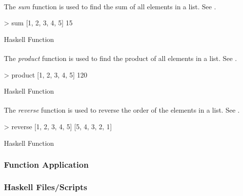 \paragraph{\texorpdfstring{}{\texttt{sum}}}\label{par:List_Sum_Function}
The \emph{sum} function is used to find the sum of all elements in a list.
See .
\begin{listing}[h!tbp]
\begin{haskellsource}
  > sum [1, 2, 3, 4, 5]
  15
\end{haskellsource}
\caption{Haskell  Function}
\label{lst:List_Sum_Function}
\end{listing}

\paragraph{\texorpdfstring{}{\texttt{product}}}\label{par:List_Product_Function}
The \emph{product} function is used to find the product of all elements in a list.
See .
\begin{listing}[h!tbp]
\begin{haskellsource}
  > product [1, 2, 3, 4, 5]
  120
\end{haskellsource}
\caption{Haskell  Function}
\label{lst:List_Product_Function}
\end{listing}

\paragraph{\texorpdfstring{}{\texttt{reverse}}}\label{par:List_Reverse_Function}
The \emph{reverse} function is used to reverse the order of the elements in a list.
See .
\begin{listing}[h!tbp]
\begin{haskellsource}
  > reverse [1, 2, 3, 4, 5]
  [5, 4, 3, 2, 1]
\end{haskellsource}
\caption{Haskell  Function}
\label{lst:List_Reverse_Function}
\end{listing}

\subsubsection{Function Application}\label{subsubsec:Function_Application}

\subsubsection{Haskell Files/Scripts}\label{subsubsec:Haskell_Scripts}


